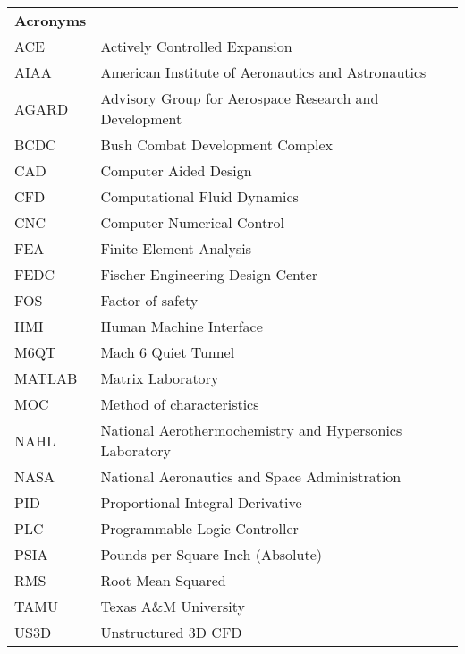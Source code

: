 \begin{spacing}{1.0}
    \begin{longtable}[htbp]{@{}p{} p{}@{}}
       
        \textbf{Acronyms}\\ [2ex] 
		ACE	& Actively Controlled Expansion\\ [2ex] %
        AIAA & American Institute of Aeronautics and Astronautics \\ [2ex]
        AGARD & Advisory Group for Aerospace Research and Development \\ [2ex]
		BCDC & Bush Combat Development Complex\\ [2ex]
        CAD & Computer Aided Design\\ [2ex]
		CFD	& Computational Fluid Dynamics\\ [2ex] 
        CNC & Computer Numerical Control\\ [2ex]
		FEA & Finite Element Analysis\\	[2ex]
		FEDC & Fischer Engineering Design Center\\ [2ex]
        FOS & Factor of safety\\ [2ex]
        HMI & Human Machine Interface\\ [2ex]
        M6QT & Mach 6 Quiet Tunnel\\ [2ex]
        MATLAB & Matrix Laboratory\\ [2ex] 
        MOC & Method of characteristics\\ [2ex]
		NAHL & National Aerothermochemistry and Hypersonics Laboratory\\ [2ex]
        NASA & National Aeronautics and Space Administration \\ [2ex]
        PID & Proportional Integral Derivative\\ [2ex]
        PLC & Programmable Logic Controller\\ [2ex]
        PSIA & Pounds per Square Inch (Absolute) \\ [2ex]
        RMS & Root Mean Squared \\ [2ex]
        TAMU & Texas A\&M University\\ [2ex]
        US3D & Unstructured 3D CFD \\ [2ex]


\end{longtable}
\end{spacing}
